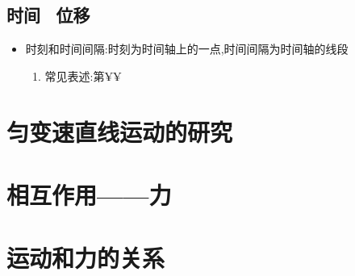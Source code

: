 \documentclass{article}
\begin{document}
\vspace{2em}

\subsection{时间 \texorpdfstring{\,}{} 位移}   

    \begin{itemize}
        \item 时刻和时间间隔:时刻为时间轴上的一点,时间间隔为时间轴的线段
        \begin{enumerate}
            \item[]常见表述:第¥¥
        \end{enumerate}
    \end{itemize}


\newpage 
\section{匀变速直线运动的研究}

\newpage
\section{相互作用——力}

\newpage
\section{运动和力的关系}
\end{document}
